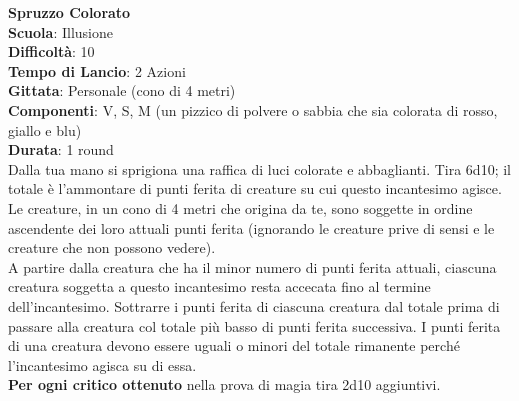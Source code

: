 \begin{multicols}{2}
\medskip\textbf{Spruzzo Colorato}\\
\textbf{Scuola}: Illusione\\
\textbf{Difficoltà}: 10\\
\textbf{Tempo di Lancio}: 2 Azioni\\
\textbf{Gittata}: Personale (cono di 4 metri)\\
\textbf{Componenti}: V, S, M (un pizzico di polvere o sabbia che sia colorata di rosso, giallo e blu)\\
\textbf{Durata}: 1 round\\
Dalla tua mano si sprigiona una raffica di luci colorate e abbaglianti. Tira 6d10; il totale è l'ammontare di punti ferita di creature su cui questo incantesimo agisce. Le creature, in un cono di 4 metri che origina da te, sono soggette in ordine ascendente dei loro attuali punti ferita (ignorando le creature prive di sensi e le creature che non possono vedere).\\
A partire dalla creatura che ha il minor numero di punti ferita attuali, ciascuna creatura soggetta a questo incantesimo resta accecata fino al termine dell'incantesimo. Sottrarre i punti ferita di ciascuna creatura dal totale prima di passare alla creatura col totale più basso di punti ferita successiva. I punti ferita di una creatura devono essere uguali o minori del totale rimanente perché l'incantesimo agisca su di essa. \\
\textbf{Per ogni critico ottenuto} nella prova di magia tira 2d10 aggiuntivi.


\end{multicols}
